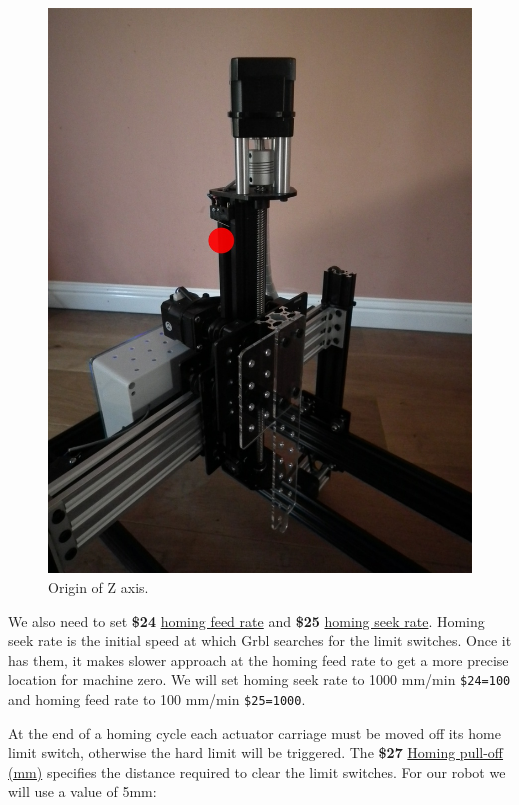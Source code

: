 \documentclass[]{book}
\theoremstyle{definition}
\theoremstyle{definition}
\theoremstyle{remark}
\begin{document}
\begin{figure}

{\centering \includegraphics[width=0.75\linewidth]{images/z_origin} 

}

\caption{Origin of Z axis.}\label{fig:zOrigin}
\end{figure}

We also need to set \textbf{\$24}
\href{https://github.com/gnea/grbl/wiki/Grbl-v1.1-Configuration\#24---homing-feed-mmmin}{homing
feed rate} and \textbf{\$25}
\href{https://github.com/gnea/grbl/wiki/Grbl-v1.1-Configuration\#25---homing-seek-mmmin}{homing
seek rate}. Homing seek rate is the initial speed at which Grbl searches
for the limit switches. Once it has them, it makes slower approach at
the homing feed rate to get a more precise location for machine zero. We
will set homing seek rate to 1000 mm/min \texttt{\$24=100} and homing
feed rate to 100 mm/min \texttt{\$25=1000}.

At the end of a homing cycle each actuator carriage must be moved off
its home limit switch, otherwise the hard limit will be triggered. The
\textbf{\$27}
\href{https://github.com/gnea/grbl/wiki/Grbl-v1.1-Configuration\#27---homing-pull-off-mm}{Homing
pull-off (mm)} specifies the distance required to clear the limit
switches. For our robot we will use a value of 5mm:
\end{document}
